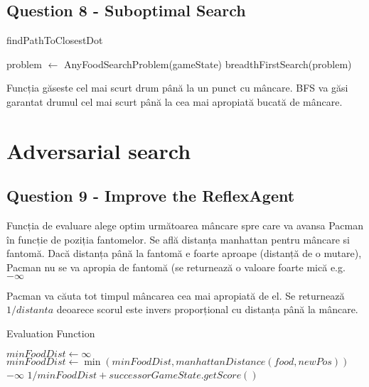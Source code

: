 \pagebreak

\subsection {Question 8 - Suboptimal Search}

\begin{algorithm}
\caption{findPathToClosestDot}
\begin{algorithmic}[1]
    \State problem $\gets$ AnyFoodSearchProblem(gameState)
    \State \Return breadthFirstSearch(problem)
\EndFunction
\end{algorithmic}
\end{algorithm}

\par Funcția găseste cel mai scurt drum până la un punct cu mâncare. BFS va găsi garantat drumul cel mai scurt până la cea mai apropiată bucată de mâncare.


\pagebreak
\section{Adversarial search}
\subsection{Question 9 - Improve the ReflexAgent} 

\par Funcția de evaluare alege optim următoarea mâncare spre care va avansa Pacman în funcție de poziția fantomelor. Se află distanța manhattan pentru mâncare si fantomă. Dacă distanța până la fantomă e foarte aproape (distanță de o mutare), Pacman nu se va apropia de fantomă (se returnează o valoare foarte mică e.g. $	- \infty$
\par Pacman va căuta tot timpul mâncarea cea mai apropiată de el. Se returnează $1 / distanta$ deoarece scorul este invers proporțional cu distanța până la mâncare. 

\begin{algorithm}
\caption{Evaluation Function}
\begin{algorithmic}[1]
    \State $minFoodDist \gets \infty$
        \State $minFoodDist \gets \min(minFoodDist, manhattanDistance(food, newPos))$
    \EndFor
            \Return $-\infty$
        \EndIf
    \EndFor
    \State \Return $1 / minFoodDist + successorGameState.getScore()$
\EndProcedure
\end{algorithmic}
\end{algorithm}
\pagebreak
